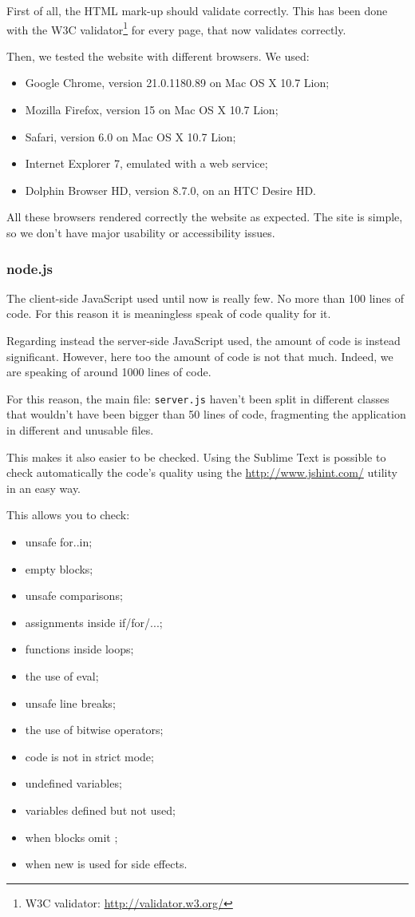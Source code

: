 First of all, the HTML mark-up should validate correctly. This has been done with the W3C validator\footnote{W3C validator: \url{http://validator.w3.org/}} for every page, that now validates correctly.

Then, we tested the website with different browsers. We used:

\begin{itemize}
\item Google Chrome, version 21.0.1180.89 on Mac OS X 10.7 Lion;
\item Mozilla Firefox, version 15 on Mac OS X 10.7 Lion;
\item Safari, version 6.0 on Mac OS X 10.7 Lion;
\item Internet Explorer 7, emulated with a web service;
\item Dolphin Browser HD, version 8.7.0, on an HTC Desire HD.
\end{itemize}

All these browsers rendered correctly the website as expected. The site is simple, so we don't have major usability or accessibility issues.

\subsubsection{node.js}

The client-side JavaScript used until now is really few. No more than 100 lines of code. For this reason it is meaningless speak of code quality for it.

Regarding instead the server-side JavaScript used, the amount of code is instead significant. However, here too the amount of code is not that much. Indeed, we are speaking of around 1000 lines of code.

For this reason, the main file: \texttt{server.js} haven't been split in different classes that wouldn't have been bigger than 50 lines of code, fragmenting the application in different and unusable files.

This makes it also easier to be checked. Using the Sublime Text is possible to check automatically the code's quality using the \url{http://www.jshint.com/} utility in an easy way.

This allows you to check:
\begin{itemize}
\item unsafe for..in;
\item empty blocks;
\item unsafe comparisons;
\item assignments inside if/for/...;
\item functions inside loops;
\item the use of eval;
\item unsafe line breaks;
\item the use of bitwise operators;
\item code is not in strict mode;
\item undefined variables;
\item variables defined but not used;
\item when blocks omit {};
\item when new is used for side effects.
\end{itemize}


